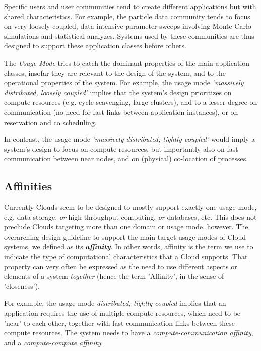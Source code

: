 \documentclass{article}
\newcommand{\I}[1]{\textit{#1}}
\newcommand{\BI}[1]{\textbf{\textit{#1}}}
\begin{document}
  Specific users and user communities tend to create different
  applications but with shared characteristics.  For example, the
  particle data community tends to focus on very loosely coupled, data
  intensive parameter sweeps involving Monte Carlo simulations and
  statistical analyzes.  Systems used by these communities are thus
  designed to support these application classes before others.
  
  The \I{Usage Mode} tries to catch the dominant
  properties of the main application classes, insofar they are
  relevant to the design of the system, and to the operational
  properties of the system.  For example, the usage mode \I{'massively
  distributed, loosely coupled'} implies that the system's design
  prioritizes on compute resources (e.g. cycle scavenging, large
  clusters), and to a lesser degree on communication (no need for fast
  links between application instances), or on reservation and co
  scheduling.

  In contrast, the usage mode \I{'massively distributed,
    tightly-coupled'} would imply a system's design to focus on compute
  resources, but importantly also on fast communication between near
  nodes, and on (physical) co-location of processes.

 \subsection{Affinities}

  Currently Clouds seem to be designed to mostly support exactly one
  usage mode, e.g.  data storage, \I{or} high throughput computing,
  \I{or} databases, etc.  This does not preclude Clouds targeting more
  than one domain or usage mode, however.  The overarching design
  guideline to support the main target usage modes of Cloud systems,
  we defined as its \BI{affinity}.  In other words, affinity is the
  term we use to indicate the type of computational characteristics
  that a Cloud supports.  That property can very often be expressed as
  the need to use different aspects or elements of a system
  \I{together} (hence the term 'Affinity', in the sense of
  'closeness').  

  For example, the usage mode \I{distributed, tightly coupled}
  implies that an application requires the use of multiple compute
  resources, which need to be 'near' to each other, together with fast
  communication links between these compute resources.  The system
  needs to have a \I{compute-communication affinity}, and a
  \I{compute-compute affinity}.
\end{document}
